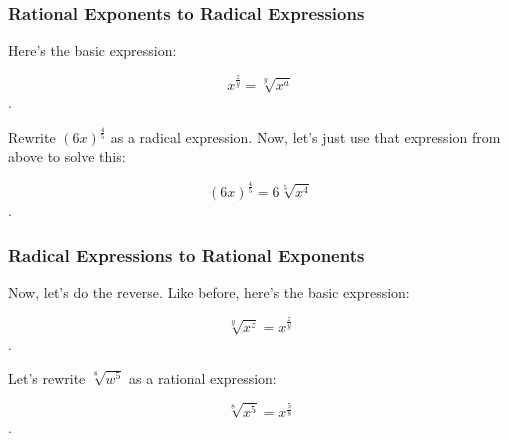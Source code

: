 
\subsubsection{Rational Exponents to Radical Expressions}
\label{sub_sub_sec:rational_exponents_to_radical_expressions}

Here's the basic expression:

\[ x^{\frac{z}{y}} = \sqrt[y]{x^{a}} \].

\begin{example}
  Rewrite $(6x)^{\frac{4}{5}}$ as a radical expression. Now, let's just use that
  expression from above to solve this:

  \[ \left(6x\right)^{\frac{4}{5}} = 6\sqrt[5]{x^{4}} \].
\end{example}


\subsubsection{Radical Expressions to Rational Exponents}
\label{sub_sub_sec:radical_expressions_to_rational_exponents}

Now, let's do the reverse. Like before, here's the basic expression:

\[ \sqrt[y]{x^{z}} = x^{\frac{z}{y}} \].

\begin{example}
  Let's rewrite $\sqrt[8]{w^{5}}$ as a rational expression:

  \[ \sqrt[8]{x^{5}} = x^{\frac{5}{8}} \].
\end{example}


\newpage
